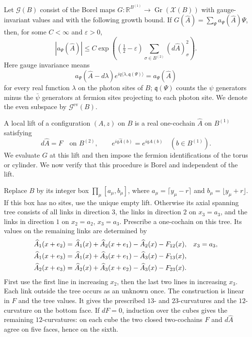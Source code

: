 \documentclass[11pt,letterpaper,reqno]{amsart}
\newcommand{\R}{\mathbb R}
\begin{document}
Let $\mathcal G(B)$ consist of the Borel maps
$G:\R^{B^{(1)}}\to\operatorname{Gr}(\mathcal X(B))$ with gauge-invariant
values and with the following growth bound. If
$G(\widehat A)=\sum_\Psi a_\Psi(\widehat A)\Psi$, then, for some
$C<\infty$ and $\varepsilon>0$,
\begin{equation}\label{eq:slab-box-growth}
 |a_\Psi(\widehat A)|\le C
   \exp\left((\tfrac12-\varepsilon)
                    \sum_{\sigma\in B^{(2)}}(d\widehat A)_\sigma^2\right).
\end{equation}
Here gauge invariance means
\begin{equation}\label{eq:slab-box-gauge}
 a_\Psi(\widehat A-d\lambda)
        e^{iq\langle\lambda,\mathfrak q(\Psi)\rangle}
       =a_\Psi(\widehat A)
\end{equation}
for every real function $\lambda$ on the photon sites of $B$;
$\mathfrak q(\Psi)$ counts the $\psi$ generators minus the
$\bar\psi$ generators at fermion sites projecting to each photon site.
We denote the even subspace by $\mathcal G^{\mathrm{ev}}(B)$.

A local lift of a configuration $(A,z)$ on $B$ is a real one-cochain
$\widehat A$ on $B^{(1)}$ satisfying
\begin{equation}\label{eq:slab-local-lift}
 d\widehat A=F\quad\text{on }B^{(2)},\qquad
 e^{iq\widehat A(b)}=e^{iqA(b)}\quad(b\in B^{(1)}).
\end{equation}
We evaluate $G$ at this lift and then impose the fermion identifications
of the torus or cylinder. We now verify that this procedure is Borel
and independent of the lift.

Replace $B$ by its integer box
$\prod_\mu[a_\mu,b_\mu]$, where $a_\mu=\lceil y_\mu-r\rceil$ and
$b_\mu=\lfloor y_\mu+r\rfloor$. If this box has no sites, use the
unique empty lift. Otherwise its axial spanning tree consists of all
links in direction $3$, the links in direction $2$ on $x_3=a_3$, and the
links in direction $1$ on $x_2=a_2$, $x_3=a_3$. Prescribe a one-cochain
on this tree. Its values on the remaining links are determined by
\begin{align}\label{eq:slab-lift-recursion}
 \widehat A_1(x+e_2)&=\widehat A_1(x)+\widehat A_2(x+e_1)
                                  -\widehat A_2(x)-F_{12}(x),
                                  &&x_3=a_3,\notag\\
 \widehat A_1(x+e_3)&=\widehat A_1(x)+\widehat A_3(x+e_1)
                                  -\widehat A_3(x)-F_{13}(x),\\
 \widehat A_2(x+e_3)&=\widehat A_2(x)+\widehat A_3(x+e_2)
                                  -\widehat A_3(x)-F_{23}(x).\notag
\end{align}
First use the first line in increasing $x_2$, then the last two lines
in increasing $x_3$. Each link outside the tree occurs as an unknown
once. The construction is linear in $F$ and the tree values. It gives
the prescribed $13$- and $23$-curvatures and the $12$-curvature on the
bottom face. If $dF=0$, induction over the cubes gives the remaining
$12$-curvatures: on each cube the two closed two-cochains $F$ and
$d\widehat A$ agree on five faces, hence on the sixth.
\end{document}
